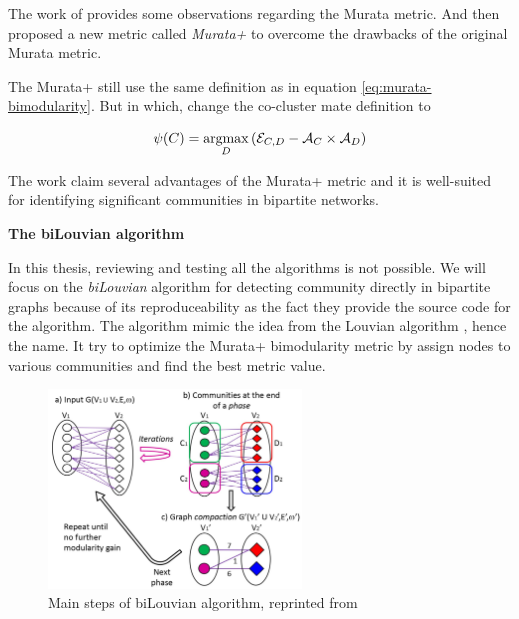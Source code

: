 The work of \parencite{pesantez2018} provides some observations regarding the Murata metric.
And then proposed a new metric called \textit{Murata+} to overcome the drawbacks of the original Murata metric.

The Murata+ still use the same definition as in equation \ref{eq:murata-bimodularity}.
But in which, change the co-cluster mate definition to

\begin{equation}
	\psi(C) = \operatorname*{argmax}_D \left(\mathcal{E}_{C, D} - \mathcal{A}_C \times \mathcal{A}_D\right)
\end{equation}

The work claim several advantages of the Murata+ metric and it is well-suited for identifying significant communities in bipartite networks.

\textbf{The biLouvian algorithm}

In this thesis, reviewing and testing all the algorithms is not possible.
We will focus on the \textit{biLouvian} algorithm \parencite{pesantez2018} for detecting community directly in bipartite graphs
because of its reproduceability as the fact they provide the source code for the algorithm.
The algorithm mimic the idea from the Louvian algorithm \parencite{blondel2008}, hence the name.
It try to optimize the Murata+ bimodularity metric by assign nodes to various communities and find the best metric value.

\begin{figure}[H]
	\centering
	\includegraphics[width=0.6\textwidth]{images/biLouvian-algorithm.png}
	\caption{Main steps of biLouvian algorithm, reprinted from \parencite{pesantez2018}}
	\label{fig:biLouvian-algorithm}
\end{figure}


